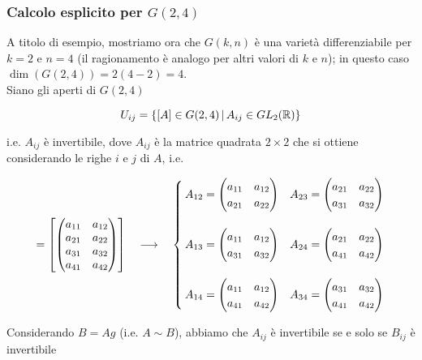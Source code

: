 \subsubsection{Calcolo esplicito per $ G(2,4) $}

A titolo di esempio, mostriamo ora che $ G(k,n) $ è una varietà differenziabile per $ k=2 $ e $ n=4 $ (il ragionamento è analogo per altri valori di $ k $ e $ n $); in questo caso $ \dim(G(2,4)) = 2(4-2) = 4 $.\\
Siano gli aperti di $ G(2,4) $

\begin{equation}
	U_{ij} = \left\{ [A] \in G(2,4) \, \middle| \, A_{ij} \in GL_{2}(\mathbb{R}) \right\}
\end{equation}

i.e. $ A_{ij} $ è invertibile, dove $ A_{ij} $ è la matrice quadrata $ 2 \times 2 $ che si ottiene considerando le righe $ i $ e $ j $ di $ A $, i.e.

\begin{equation}
	[A] = \left[ \pmqty{ a_{11} & a_{12} \\ a_{21} & a_{22} \\ a_{31} & a_{32} \\ a_{41} & a_{42} } \right] \quad \longrightarrow \quad %
	\begin{cases}
		A_{12} = \pmqty{ a_{11} & a_{12} \\ a_{21} & a_{22} } & A_{23} = \pmqty{ a_{21} & a_{22} \\ a_{31} & a_{32} }\\\\
		A_{13} = \pmqty{ a_{11} & a_{12} \\ a_{31} & a_{32} } & A_{24} = \pmqty{ a_{21} & a_{22} \\ a_{41} & a_{42} }\\\\
		A_{14} = \pmqty{ a_{11} & a_{12} \\ a_{41} & a_{42} } & A_{34} = \pmqty{ a_{31} & a_{32} \\ a_{41} & a_{42} }
	\end{cases}
\end{equation}

Considerando $ B = A g $ (i.e. $ A \sim B $), abbiamo che $ A_{ij} $ è invertibile se e solo se $ B_{ij} $ è invertibile

